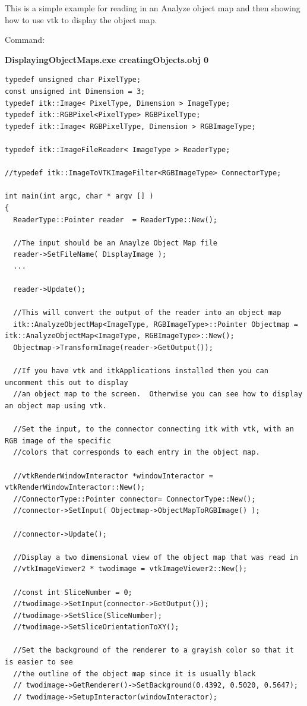 \documentclass{InsightArticle}
\begin{document}
\begin{itemize}
This is a simple example for reading in an Analyze object map and
then showing how to use vtk to display the object map. 


Command:

\textbf{DisplayingObjectMaps.exe creatingObjects.obj 0}

\small \begin{verbatim}
typedef unsigned char PixelType;
const unsigned int Dimension = 3;
typedef itk::Image< PixelType, Dimension > ImageType;
typedef itk::RGBPixel<PixelType> RGBPixelType;
typedef itk::Image< RGBPixelType, Dimension > RGBImageType;

typedef itk::ImageFileReader< ImageType > ReaderType;

//typedef itk::ImageToVTKImageFilter<RGBImageType> ConnectorType;

int main(int argc, char * argv [] )
{
  ReaderType::Pointer reader  = ReaderType::New();
  
  //The input should be an Anaylze Object Map file
  reader->SetFileName( DisplayImage );
  ...
  
  reader->Update();
  
  //This will convert the output of the reader into an object map
  itk::AnalyzeObjectMap<ImageType, RGBImageType>::Pointer Objectmap = itk::AnalyzeObjectMap<ImageType, RGBImageType>::New();
  Objectmap->TransformImage(reader->GetOutput());
  
  //If you have vtk and itkApplications installed then you can uncomment this out to display
  //an object map to the screen.  Otherwise you can see how to display an object map using vtk.
  
  //Set the input, to the connector connecting itk with vtk, with an RGB image of the specific
  //colors that corresponds to each entry in the object map.
  
  //vtkRenderWindowInteractor *windowInteractor = vtkRenderWindowInteractor::New();
  //ConnectorType::Pointer connector= ConnectorType::New();
  //connector->SetInput( Objectmap->ObjectMapToRGBImage() );
  
  //connector->Update();
  
  //Display a two dimensional view of the object map that was read in
  //vtkImageViewer2 * twodimage = vtkImageViewer2::New();
  
  //const int SliceNumber = 0;
  //twodimage->SetInput(connector->GetOutput());
  //twodimage->SetSlice(SliceNumber);
  //twodimage->SetSliceOrientationToXY();
  
  //Set the background of the renderer to a grayish color so that it is easier to see
  //the outline of the object map since it is usually black
  // twodimage->GetRenderer()->SetBackground(0.4392, 0.5020, 0.5647);
  // twodimage->SetupInteractor(windowInteractor);
   

\end{verbatim}
\end{itemize}
\end{document}
